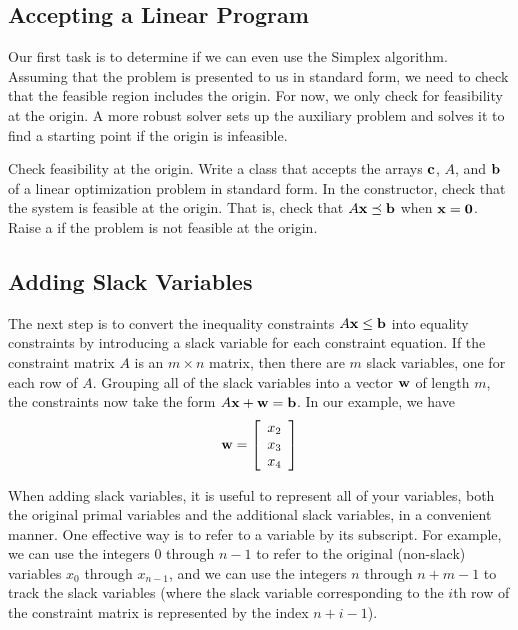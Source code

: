 \subsection*{Accepting a Linear Program} %

Our first task is to determine if we can even use the Simplex algorithm.
Assuming that the problem is presented to us in standard form, we need to check that the feasible region includes the origin.  For now, we only check for feasibility at the origin. A more robust solver sets up the auxiliary problem and solves it to find a starting point if the origin is infeasible.

\begin{problem}{Check feasibility at the origin.}{}
Write a class that accepts the arrays $\mathbf{c}$, $A$, and $\mathbf{b}$ of a linear optimization problem in standard form.
In the constructor, check that the system is feasible at the origin.
That is, check that $A\mathbf{x} \preceq \mathbf{b}$ when $\mathbf{x} = \mathbf{0}$. Raise a  if the problem is not feasible at the origin. \label{prob:initsolver}
\end{problem}

\subsection*{Adding Slack Variables} %

The next step is to convert the inequality constraints $A\mathbf{x} \leq \mathbf{b}$ into equality constraints by introducing a slack variable for each constraint equation.
If the constraint matrix $A$ is an $m \times n$ matrix, then there are $m$ slack variables, one for each row of $A$.
Grouping all of the slack variables into a vector $\mathbf{w}$ of length $m$, the constraints now take the form $A\mathbf{x} + \mathbf{w} = \mathbf{b}$.
In our example, we have \[\mathbf{w} = \left[\begin{array}{c}x_2\\x_3 \\x_4\end{array}\right]\]

When adding slack variables, it is useful to represent all of your variables, both the original primal variables and the additional slack variables, in a convenient manner.
One effective way is to refer to a variable by its subscript.
For example, we can use the integers $0$ through $n-1$ to refer to the original (non-slack) variables $x_0$ through $x_{n-1}$, and we can use the integers $n$ through $n+m-1$ to track the slack variables (where the slack variable corresponding to the $i$th row of the constraint matrix is represented by the index $n+i-1$).

